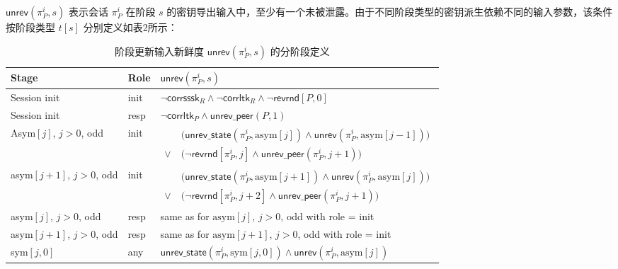 \begin{definition}[阶段更新输入新鲜度]
\label{def:input_fresh}
 $\mathsf{unrev}(\pi_P^i, s)$ 表示会话 $\pi_P^i$ 在阶段 $s$ 的密钥导出输入中，至少有一个未被泄露。由于不同阶段类型的密钥派生依赖不同的输入参数，该条件按阶段类型 $t[s]$ 分别定义如表2所示：



 


\begin{table}[htbp]
\centering
\caption{阶段更新输入新鲜度 $\mathsf{unrev}(\pi_P^i, s)$ 的分阶段定义}
\label{tab:unrev_by_stage}
\small
\setlength{\tabcolsep}{5pt}
\renewcommand{\arraystretch}{1.4}
\begin{tabular}{@{}lll@{}}
\toprule
\textbf{Stage} & \textbf{Role} & \textbf{$\mathsf{unrev}(\pi_P^i, s)$} \\
\midrule

Session init & init & 
$\neg \mathsf{corrsssk}_R \land \neg \mathsf{corrltk}_R \land \neg \mathsf{revrnd}[P,0]$ \\

Session init & resp & 
$\neg \mathsf{corrltk}_P \land \mathsf{unrev\_peer}(P, 1)$ \\

Asym$[j]$, $j>0$, odd & init & 
$\begin{aligned}
&\big( \mathsf{unrev\_state}(\pi_P^i, \mathrm{asym}[j]) \land \mathsf{unrev}(\pi_P^i, \mathrm{asym}[j-1]) \big) \\
\lor\ &\big( \neg \mathsf{revrnd}[\pi_P^i, j] \land \mathsf{unrev\_peer}(\pi_P^i, j+1) \big)
\end{aligned}$ \\

asym$[j+1]$, $j>0$, odd & init & 
$\begin{aligned}
&\big( \mathsf{unrev\_state}(\pi_P^i, \mathrm{asym}[j+1]) \land \mathsf{unrev}(\pi_P^i, \mathrm{asym}[j]) \big) \\
\lor\ &\big( \neg \mathsf{revrnd}[\pi_P^i, j+2] \land \mathsf{unrev\_peer}(\pi_P^i, j+1) \big)
\end{aligned}$ \\

asym$[j]$, $j>0$, odd & resp & 
same as for $\mathrm{asym}[j]$, $j>0$, odd with role = init \\

asym$[j+1]$, $j>0$, odd & resp & 
same as for $\mathrm{asym}[j+1]$, $j>0$, odd with role = init \\

sym$[j,0]$ & any & 
$\mathsf{unrev\_state}(\pi_P^i, \mathrm{sym}[j,0]) \land \mathsf{unrev}(\pi_P^i, \mathrm{asym}[j])$ \\


\end{tabular}
\end{table}
\end{definition}
